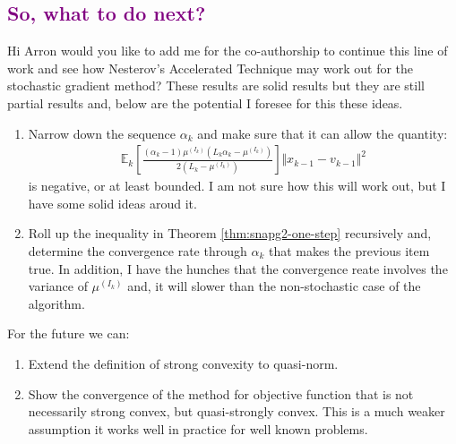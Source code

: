 \documentclass[12pt]{article}
\begin{document}
    \subsection{\textcolor{purple}{So, what to do next?}}
        Hi Arron would you like to add me for the co-authorship to continue this line of work and see how Nesterov's Accelerated Technique may work out for the stochastic gradient method? 
        These results are solid results but they are still partial results and, below are the potential I foresee for this these ideas. 
        \begin{enumerate}
            \item Narrow down the sequence $\alpha_k$ and make sure that it can allow the quantity: 
            \begin{align*}
                \mathbb E_k\left[
                        \frac{(\alpha_k - 1)\mu^{(I_k)}\left(L_k\alpha_k - \mu^{(I_k)}\right)}{2\left(L_k - \mu^{(I_k)}\right)}
                    \right]\Vert x_{k - 1} - v_{k - 1} \Vert^2
            \end{align*}
            is negative, or at least bounded. I am not sure how this will work out, but I have some solid ideas aroud it. 
            \item Roll up the inequality in Theorem \ref{thm:snapg2-one-step} recursively and, determine the convergence rate through $\alpha_k$ that makes the previous item true. 
            In addition, I have the hunches that the convergence reate involves the variance of $\mu^{(I_k)}$ and, it will slower than the non-stochastic case of the algorithm. 
        \end{enumerate}
        For the future we can: 
        \begin{enumerate}
            \item Extend the definition of strong convexity to quasi-norm. 
            \item Show the convergence of the method for objective function that is not necessarily strong convex, but quasi-strongly convex. This is a much weaker assumption it works well in practice for well known problems.  
        \end{enumerate}
    



\end{document}
